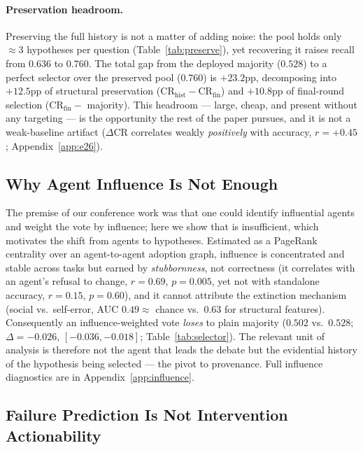 \paragraph{Preservation headroom.}
\label{par:preservation_headroom}
Preserving the full history is not a matter of adding noise: the pool holds only $\approx 3$ hypotheses per
question (Table~\ref{tab:preserve}), yet recovering it raises recall from $0.636$ to $0.760$. The total gap
from the deployed majority ($0.528$) to a perfect selector over the preserved pool ($0.760$) is $+23.2$pp,
decomposing into $+12.5$pp of structural preservation ($\mathrm{CR}_{\mathrm{hist}}-\mathrm{CR}_{\mathrm{fin}}$)
and $+10.8$pp of final-round selection ($\mathrm{CR}_{\mathrm{fin}}-$ majority). This headroom --- large,
cheap, and present without any targeting --- is the opportunity the rest of the paper pursues, and it is not a
weak-baseline artifact ($\Delta\mathrm{CR}$ correlates weakly \emph{positively} with accuracy, $r=+0.45$;
Appendix~\ref{app:e26}).


\subsection{Why Agent Influence Is Not Enough}
\label{subsec:influence_insufficient}

\label{par:influence_aggregation}
The premise of our conference work was that one could identify influential agents and weight the vote by
influence; here we show that is insufficient, which motivates the shift from agents to hypotheses. Estimated
as a PageRank centrality over an agent-to-agent adoption graph, influence is concentrated and stable across
tasks but earned by \emph{stubbornness}, not correctness (it correlates with an agent's refusal to change,
$r=0.69$, $p=0.005$, yet not with standalone accuracy, $r=0.15$, $p=0.60$), and it cannot attribute the
extinction mechanism (social vs.\ self-error, AUC $0.49\approx$ chance vs.\ $0.63$ for structural features).
Consequently an influence-weighted vote \emph{loses} to plain majority ($0.502$ vs.\ $0.528$; $\Delta=-0.026$,
$[-0.036,-0.018]$; Table~\ref{tab:selector}). The relevant unit of analysis is therefore not the agent that
leads the debate but the evidential history of the hypothesis being selected --- the pivot to provenance.
Full influence diagnostics are in Appendix~\ref{app:influence}.


\subsection{Failure Prediction Is Not Intervention Actionability}
\label{subsec:prediction_actionability}

